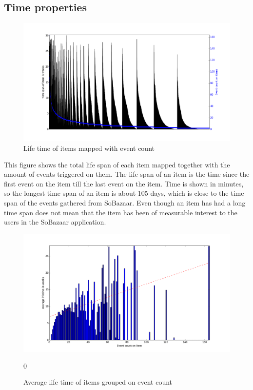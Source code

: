 \subsection{Time properties}

    \begin{figure}[H]
        \includegraphics[width=5in]{image/itemTimeSpansortedoneventcount.png}
        \centering
        \caption{Life time of items mapped with event count}
    \label{figure:itemTimeSpanEventCount}
    \end{figure}
        This figure shows the total life span of each item mapped together with the amount of events triggered on them.
        The life span of an item is the time since the first event on the item till the last event on the item.
        Time is shown in minutes, so the longest time span of an item is about 105 days, which is close to the time span of the events gathered from SoBazaar.
        Even though an item has had a long time span does not mean that the item has been of measurable interest to the users in the SoBazaar application.

    \begin{figure}[H]
        \includegraphics[width=5in]{image/avglifetimeoncount.png}
        \centering
        \caption{Average life time of items grouped on event count}
    \label{figure:averageLifetimBasedoncount}0
    \end{figure}

